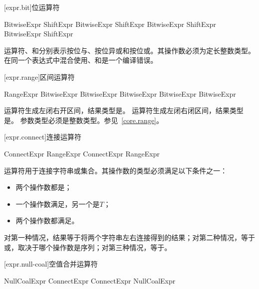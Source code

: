 [expr.bit]{位运算符}

\begin{bnf}{BitwiseExpr}
    ShiftExpr \br
    BitwiseExpr  ShiftExpr \br
    BitwiseExpr  ShiftExpr \br
    BitwiseExpr  ShiftExpr
\end{bnf}

\pnum
运算符、和分别表示按位与、按位异或和按位或。其操作数必须为定长整数类型。在同一个表达式中混合使用、和是一个编译错误。

[expr.range]{区间运算符}

\begin{bnf}{RangeExpr}
    BitwiseExpr \br
    BitwiseExpr  BitwiseExpr \br
    BitwiseExpr  BitwiseExpr
\end{bnf}

\pnum
运算符生成左闭右开区间，结果类型是。
运算符生成左闭右闭区间，结果类型是。
参数类型必须是整数类型。参见~\ref{core.range}。

[expr.connect]{连接运算符}

\begin{bnf}{ConnectExpr}
    RangeExpr \br
    ConnectExpr \terminal{\~} RangeExpr
\end{bnf}

\pnum
运算符\tcode{\~}用于连接字符串或集合。其操作数的类型必须满足以下条件之一：

\begin{itemize}
    \item 两个操作数都是；
    \item 一个操作数满足，另一个是$T$；
    \item 两个操作数都满足。
\end{itemize}

对第一种情况，结果等于将两个字符串左右连接得到的结果；对第二种情况，等于\tcode{[$x$, ...$y$]}或\tcode{[...$x$, $y$]}，取决于哪个操作数是序列；对第三种情况，等于\tcode{[...$x$, ...$y$]}。

[expr.null-coal]{空值合并运算符}

\begin{bnf}{NullCoalExpr}
    ConnectExpr \br
    ConnectExpr  NullCoalExpr
\end{bnf}

